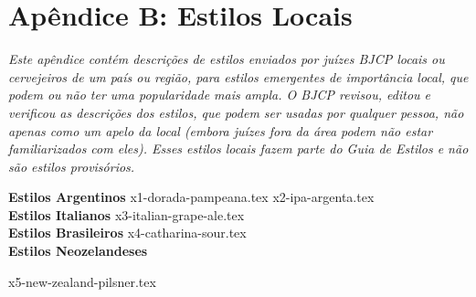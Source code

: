 \clearpage
{}
\divisorLine
\section*{Apêndice B: Estilos Locais}

\textit{Este apêndice contém descrições de estilos enviados por juízes BJCP locais ou cervejeiros de um país ou região, para estilos emergentes de importância local, que podem ou não ter uma popularidade mais ampla. O BJCP revisou, editou e verificou as descrições dos estilos, que podem ser usadas por qualquer pessoa, não apenas como um apelo da local (embora juízes fora da área podem não estar familiarizados com eles). Esses estilos locais fazem parte do Guia de Estilos e não são estilos provisórios.}

\begin{multicols*}{2}

  \textbf{\Large\color{blue}Estilos Argentinos }
  {x1-dorada-pampeana.tex}
	{x2-ipa-argenta.tex}\\

  \textbf{\Large\color{blue}Estilos Italianos }
	{x3-italian-grape-ale.tex}\\

  \textbf{\Large\color{blue}Estilos Brasileiros }
	{x4-catharina-sour.tex}\\

  \textbf{\Large\color{blue}Estilos Neozelandeses }

	{x5-new-zealand-pilsner.tex}

\end{multicols*}
